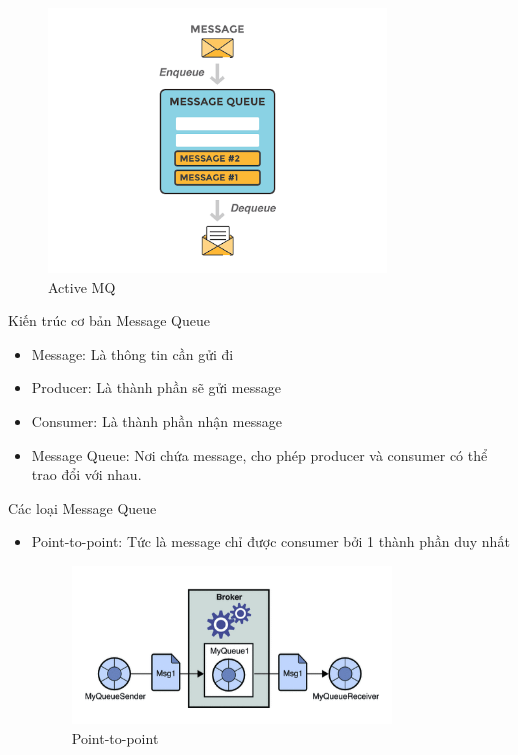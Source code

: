 \begin{itemize}
             \begin{figure}[!ht]   			\includegraphics[width=0.8\textwidth]{Images/message.png}
			\centering
			\linebreak
			\caption{Active MQ}
	        \end{figure}
		        
            Kiến trúc cơ bản Message Queue
            
            \begin{itemize}
                \item Message: Là thông tin cần gửi đi
                \item Producer: Là thành phần sẽ gửi message
                \item Consumer: Là thành phần nhận message
                \item Message Queue: Nơi chứa message, cho phép producer và consumer có thể trao đổi với nhau.
            \end{itemize}
            
            Các loại Message Queue
            
            \begin{itemize}
                \item Point-to-point: Tức là message chỉ được consumer bởi 1 thành phần duy nhất
                
                \newpage
                
                \begin{figure}[!ht]   			\includegraphics[width=0.8\textwidth]{Images/PTP.png}
        		\centering
        		\linebreak
        		\caption{Point-to-point}
                \end{figure}
                

\end{itemize}
\end{itemize}
